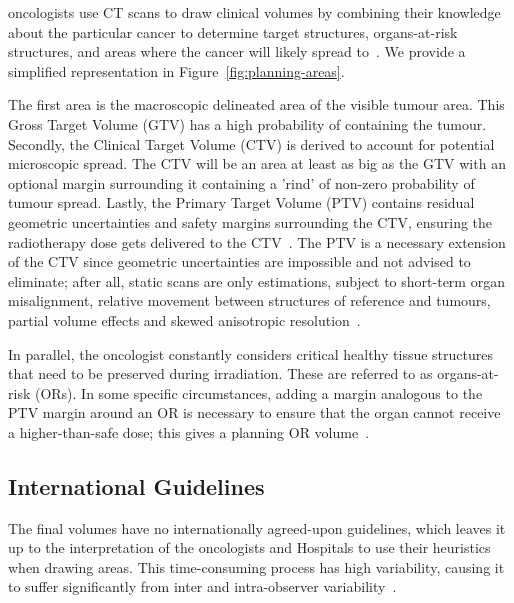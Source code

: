 \documentclass[12pt,twoside]{report}
\begin{document}
oncologists use CT scans to draw clinical volumes by combining their knowledge about the particular cancer to determine target structures, organs-at-risk structures, and areas where the cancer will likely spread to~\cite{AMLART-data}. We provide a simplified representation in Figure~\ref{fig:planning-areas}.

The first area is the macroscopic delineated area of the visible tumour area. This Gross Target Volume (GTV) has a high probability of containing the tumour. Secondly, the Clinical Target Volume (CTV) is derived to account for potential microscopic spread. The CTV will be an area at least as big as the GTV with an optional margin surrounding it containing a 'rind' of non-zero probability of tumour spread. Lastly, the Primary Target Volume (PTV) contains residual geometric uncertainties and safety margins surrounding the CTV, ensuring the radiotherapy dose gets delivered to the CTV~\cite{tumor-delineation,defining-target-volumes,Lin2021-oz,personalised-PTV-strategies}. The PTV is a necessary extension of the CTV since geometric uncertainties are impossible and not advised to eliminate; after all, static scans are only estimations, subject to short-term organ misalignment, relative movement between structures of reference and tumours, partial volume effects and skewed anisotropic resolution~\cite{VANHERK200452}.

In parallel, the oncologist constantly considers critical healthy tissue structures that need to be preserved during irradiation. These are referred to as organs-at-risk (ORs). In some specific circumstances, adding a margin analogous to the PTV margin around an OR is necessary to ensure that the organ cannot receive a higher-than-safe dose; this gives a planning OR volume~\cite{defining-target-volumes}.

\subsection{International Guidelines}

The final volumes have no internationally agreed-upon guidelines, which leaves it up to the interpretation of the oncologists and Hospitals to use their heuristics when drawing areas.  This time-consuming process has high variability, causing it to suffer significantly from inter and intra-observer variability~\cite{Lin2021-oz}. 

\end{document}

